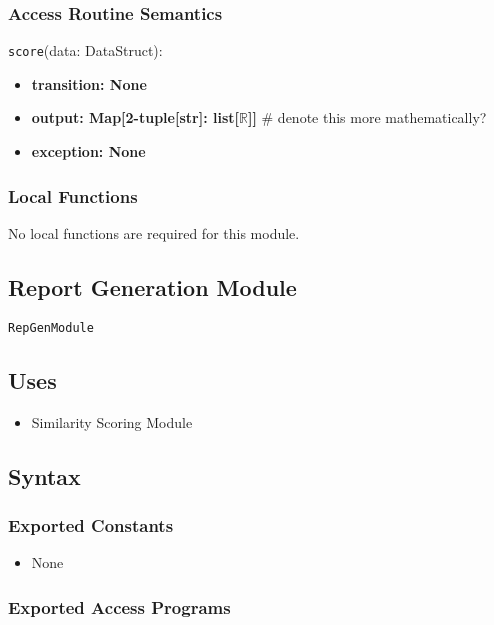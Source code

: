 \documentclass[12pt, titlepage]{article}
\begin{document}
\subsubsection{Access Routine Semantics}
\noindent \texttt{score}(data: DataStruct):
\begin{itemize}
    \item \textbf{transition: None} 
    \item \textbf{output: Map[2-tuple[str]: list[$\mathbb{R}$]]} \# denote this more mathematically?
    \item \textbf{exception: None}
\end{itemize}

\subsubsection{Local Functions}
No local functions are required for this module.



\subsection{Report Generation Module}

\texttt{RepGenModule}

\subsection{Uses}

\begin{itemize}
    \item Similarity Scoring Module
\end{itemize}

\subsection{Syntax}

\subsubsection{Exported Constants}

\begin{itemize}
    \item None
\end{itemize}

\subsubsection{Exported Access Programs}
\end{document}
